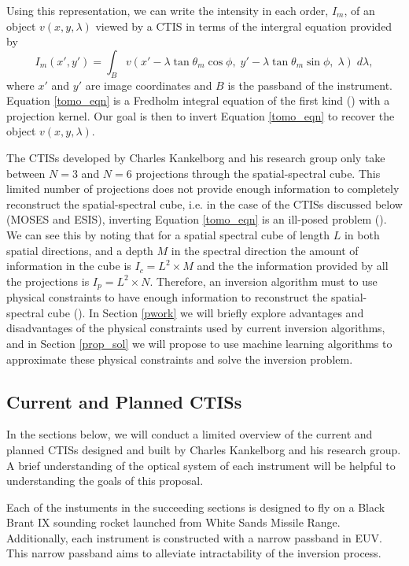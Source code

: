 \documentclass{article}
\begin{document}
			Using this representation, we can write the intensity in each order, $I_m$, of an object $v(x,y,\lambda)$ viewed by a CTIS in terms of the intergral equation provided by \cite{fox1}
			\begin{equation}
				I_m (x',y') = \int_B v(x' - \lambda \tan \theta_m \cos \phi, \; y' - \lambda \tan \theta_m \sin \phi, \; \lambda) \; d\lambda,
				\label{tomo_eqn}
			\end{equation}
			where $x'$ and $y'$ are image coordinates and $B$ is the passband of the instrument. Equation \ref{tomo_eqn} is a Fredholm integral equation of the first kind (\cite{RHB}) with a projection kernel. Our goal is then to invert Equation \ref{tomo_eqn} to recover the object $v(x,y,\lambda)$.
			
			The CTISs developed by Charles Kankelborg and his research group only take between $N=3$ and $N=6$ projections through the spatial-spectral cube. This limited number of projections does not provide enough information to completely reconstruct the spatial-spectral cube, i.e. in the case of the CTISs discussed below (MOSES and ESIS), inverting Equation \ref{tomo_eqn} is an ill-posed problem (\cite{inversion}). We can see this by noting that for a spatial spectral cube of length $L$ in both spatial directions, and a depth $M$ in the spectral direction the amount of information in the cube is $I_c = L^2 \times M$ and the the information provided by all the projections is $I_p = L^2 \times N$. Therefore, an inversion algorithm must to use physical constraints to have enough information to reconstruct the spatial-spectral cube (\cite{inversion}). In Section \ref{pwork} we will briefly explore advantages and disadvantages of the physical constraints used by current inversion algorithms, and in Section \ref{prop_sol} we will propose to use machine learning algorithms to approximate these physical constraints and solve the inversion problem.
			
		\subsection{Current and Planned CTISs}

			In the sections below, we will conduct a limited overview of the current and planned CTISs designed and built by Charles Kankelborg and his research group. A brief understanding of the optical system of each instrument will be helpful to understanding the goals of this proposal. 

			Each of the instuments in the succeeding sections is designed to fly on a Black Brant IX sounding rocket launched from White Sands Missile Range. Additionally, each instrument is constructed with a narrow passband in EUV. This narrow passband aims to alleviate intractability of the inversion process.
\end{document}
